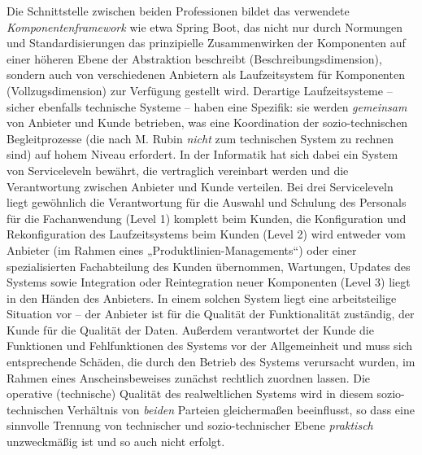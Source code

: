 \documentclass[11pt,a4paper]{article}
\begin{document}
Die Schnittstelle zwischen beiden Professionen bildet das verwendete
\emph{Komponentenframework} wie etwa Spring Boot, das nicht nur durch
Normungen und Standardisierungen das prinzipielle Zusammenwirken der
Komponenten auf einer höheren Ebene der Abstraktion beschreibt
(Beschreibungsdimension), sondern auch von verschiedenen Anbietern als
Laufzeitsystem für Komponenten (Vollzugsdimension) zur Verfügung gestellt
wird. Derartige Laufzeitsysteme -- sicher ebenfalls technische Systeme --
haben eine Spezifik: sie werden \emph{gemeinsam} von Anbieter und Kunde
betrieben, was eine Koordination der sozio-technischen Begleitprozesse (die
nach M. Rubin \emph{nicht} zum technischen System zu rechnen sind) auf hohem
Niveau erfordert. In der Informatik hat sich dabei ein System von
Serviceleveln bewährt, die vertraglich vereinbart werden und die Verantwortung
zwischen Anbieter und Kunde verteilen. Bei drei Serviceleveln liegt gewöhnlich
die Verantwortung für die Auswahl und Schulung des Personals für die
Fachanwendung (Level 1) komplett beim Kunden, die Konfiguration und
Rekonfiguration des Laufzeitsystems beim Kunden (Level 2) wird entweder vom
Anbieter (im Rahmen eines „Produktlinien-Managements“) oder einer
spezialisierten Fachabteilung des Kunden übernommen, Wartungen, Updates des
Systems sowie Integration oder Reintegration neuer Komponenten (Level 3) liegt
in den Händen des Anbieters. In einem solchen System liegt eine arbeitsteilige
Situation vor -- der Anbieter ist für die Qualität der Funktionalität
zuständig, der Kunde für die Qualität der Daten. Außerdem verantwortet der
Kunde die Funktionen und Fehlfunktionen des Systems vor der Allgemeinheit und
muss sich entsprechende Schäden, die durch den Betrieb des Systems verursacht
wurden, im Rahmen eines Anscheinsbeweises zunächst rechtlich zuordnen lassen.
Die operative (technische) Qualität des realweltlichen Systems wird in diesem
sozio-technischen Verhältnis von \emph{beiden} Parteien gleichermaßen
beeinflusst, so dass eine sinnvolle Trennung von technischer und
sozio-technischer Ebene \emph{praktisch} unzweckmäßig ist und so auch nicht
erfolgt.
\end{document}
